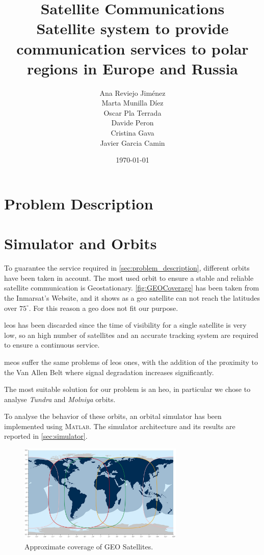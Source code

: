 \documentclass[11pt,a4paper,titlepage]{article}
\title{\blue Satellite Communications \\
\blueb Satellite system to provide communication services to polar regions in Europe and Russia}
\author{Ana Reviejo Jiménez \\ Marta Munilla Díez\\ Oscar Pla Terrada\\ Davide Peron\\ Cristina Gava\\ Javier Garcia Camin}
\date{\today}
\begin{document}
\maketitle

\tableofcontents
\clearpage

\section{Problem Description} \label{sec:problem_description}
	

\section{Simulator and Orbits} \label{sec:orbit}
	To guarantee the service required in \autoref{sec:problem_description}, different orbits have been taken in account.
	The most used orbit to ensure a stable and reliable satellite communication is Geostationary.
	\autoref{fig:GEOCoverage} has been taken from the Inmarsat's Website, and it shows as a \gls{geo} satellite can not reach the latitudes over $75^\circ$. For this reason a \gls{geo} does not fit our purpose.

	\glspl{leo} has been discarded since the time of visibility for a single satellite is very low, so an high number of satellites and an accurate tracking system are required to ensure a continuous service.

	\glspl{meo} suffer the same problems of \glspl{leo} ones, with the addition of the proximity to the Van Allen Belt where signal degradation increases significantly.

	The most suitable solution for our problem is an \gls{heo}, in particular we chose to analyse \textit{Tundra} and \textit{Molniya} orbits.

	To analyse the behavior of these orbits, an orbital simulator has been implemented using \textsc{Matlab}.
	The simulator architecture and its results are reported in \autoref{sec:simulator}.

	\begin{figure}
		\centering
		\includegraphics[width=0.7\textwidth]{figures/GEOCoverage.jpeg}
		\caption{Approximate coverage of GEO Satellites.}
		\label{fig:GEOCoverage}
	\end{figure}
\end{document}
